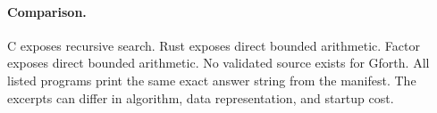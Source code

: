\paragraph{Comparison.}
C exposes recursive search. Rust exposes direct bounded arithmetic. Factor exposes direct bounded arithmetic.
No validated source exists for Gforth.
All listed programs print the same exact answer string from the manifest. The excerpts can differ in algorithm, data representation, and startup cost.

